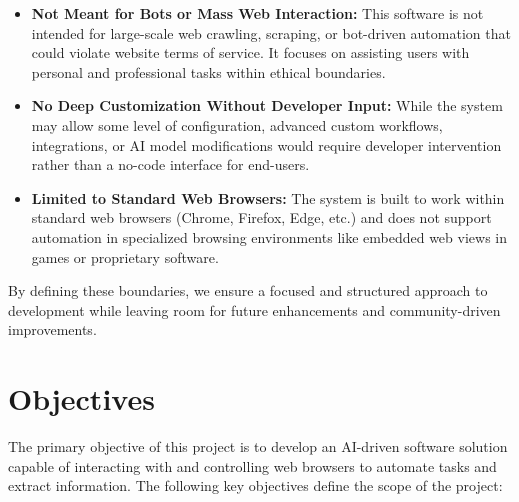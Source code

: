 \documentclass[conference]{IEEEtran}
\begin{document}
\begin{itemize}
    \item \textbf{Not Meant for Bots or Mass Web Interaction:}
          This software is not intended for large-scale web crawling, scraping, or bot-driven automation that could violate website terms of service. It focuses on assisting users with personal and professional tasks within ethical boundaries.

    \item \textbf{No Deep Customization Without Developer Input:}
          While the system may allow some level of configuration, advanced custom workflows, integrations, or AI model modifications would require developer intervention rather than a no-code interface for end-users.

    \item \textbf{Limited to Standard Web Browsers:}
          The system is built to work within standard web browsers (Chrome, Firefox, Edge, etc.) and does not support automation in specialized browsing environments like embedded web views in games or proprietary software.

\end{itemize}

By defining these boundaries, we ensure a focused and structured approach to development while leaving room for future enhancements and community-driven improvements.

\section{Objectives}
The primary objective of this project is to develop an AI-driven software solution capable of interacting with and controlling web browsers to automate tasks and extract information. The following key objectives define the scope of the project:
\end{document}
